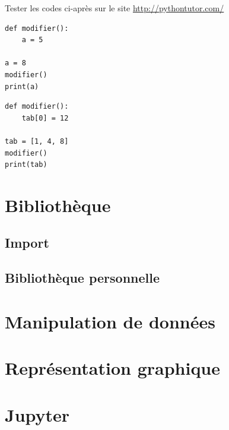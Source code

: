 \documentclass[a4paper,11pt]{article}
\begin{document}
\begin{Form}
\begin{aretenir}
\begin{itemize}
\begin{activite}
Tester les codes ci-après sur le site \url{http://pythontutor.com/}
\begin{center}
\begin{lstlisting}
def modifier():
	a = 5

a = 8
modifier()
print(a)
\end{lstlisting}
\label{moncode}
\end{center}

\begin{center}
\begin{lstlisting}
def modifier():
	tab[0] = 12

tab = [1, 4, 8]
modifier()
print(tab)
\end{lstlisting}
\label{moncode}
\end{center}
\end{activite}
\end{itemize}
\end{aretenir}
\section{Bibliothèque}
\subsection{Import}
\subsection{Bibliothèque personnelle}
\section{Manipulation de données}
\section{Représentation graphique}
\section{Jupyter}
\end{Form}
\end{document}
